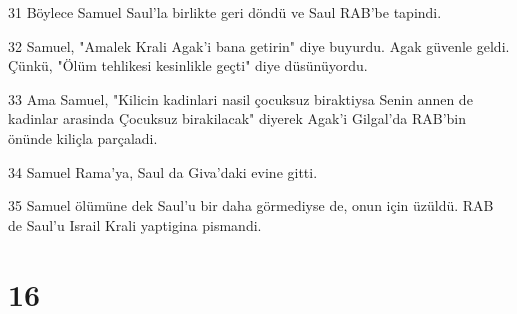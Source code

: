 \par 31 Böylece Samuel Saul'la birlikte geri döndü ve Saul RAB'be tapindi.
\par 32 Samuel, "Amalek Krali Agak'i bana getirin" diye buyurdu. Agak güvenle geldi. Çünkü, "Ölüm tehlikesi kesinlikle geçti" diye düsünüyordu.
\par 33 Ama Samuel, "Kilicin kadinlari nasil çocuksuz biraktiysa Senin annen de kadinlar arasinda Çocuksuz birakilacak" diyerek Agak'i Gilgal'da RAB'bin önünde kiliçla parçaladi.
\par 34 Samuel Rama'ya, Saul da Giva'daki evine gitti.
\par 35 Samuel ölümüne dek Saul'u bir daha görmediyse de, onun için üzüldü. RAB de Saul'u Israil Krali yaptigina pismandi.

\chapter{16}

